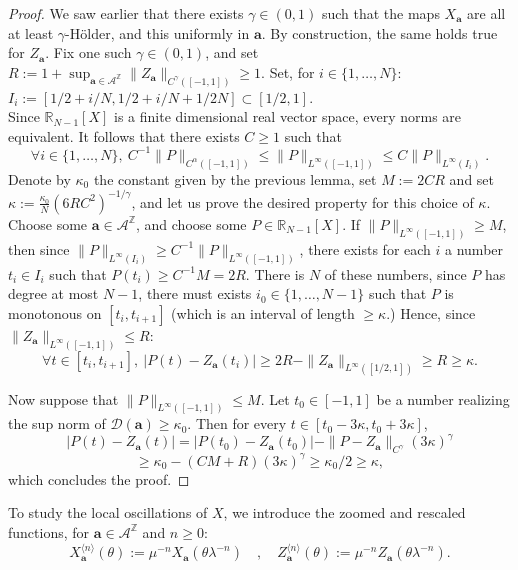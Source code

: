 \documentclass[11pt]{amsart}
\theoremstyle{plain}
\theoremstyle{definition}
\numberwithin{equation}{section}
\begin{document}
\begin{proof}
We saw earlier that there exists $\gamma \in (0,1)$ such that the maps $X_\mathbf{a}$ are all at least $\gamma$-Hölder, and this uniformly in $\mathbf{a}$. By construction, the same holds true for $Z_\mathbf{a}$. Fix one such $\gamma \in (0,1)$, and set $R := 1+ \sup_{\mathbf{a} \in \mathcal{A}^\mathbb{Z}} \|Z_\mathbf{a}\|_{C^\gamma([-1,1])} \geq 1$. Set, for $i \in \{1,\dots,N\}$: $I_i := [1/2+i/N,1/2+i/N+1/2N] \subset [1/2,1]$.   \\
Since $\mathbb{R}_{N-1}[X]$ is a finite dimensional real vector space, every norms are equivalent. It follows that there exists $C \geq 1$ such that $$ \forall i \in  \{ 1, \dots, N \}, \  C^{-1} \|P\|_{C^\alpha([-1,1])} \leq \|P\|_{L^\infty([-1,1])} \leq C \|P\|_{L^\infty(I_i)}.$$
Denote by $\kappa_0$ the constant given by the previous lemma, set $M := 2CR$ and set $\kappa := \frac{\kappa_0}{N} (6R C^2 )^{-1/\gamma}$, and let us prove the desired property for this choice of $\kappa$. Choose some $\mathbf{a} \in \mathcal{A}^\mathbb{Z}$, and choose some $P \in \mathbb{R}_{N-1}[X]$. If $\|P\|_{L^\infty([-1,1])} \geq M$, then since $\|P\|_{L^\infty(I_i)} \geq C^{-1} \|P\|_{L^\infty([-1,1])}$, there exists for each $i$ a number $t_i \in I_i$ such that $P(t_i) \geq C^{-1}M = 2R$. There is $N$ of these numbers, since $P$ has degree at most $N-1$, there must exists $i_0 \in \{1,\dots,N-1\}$ such that $P$ is monotonous on $[t_i,t_{i+1}]$ (which is an interval of length $\geq \kappa$.) Hence, since $\|Z_\mathbf{a}\|_{L^\infty([-1,1])} \leq R$:
$$\forall t \in [t_i,t_{i+1}], \ |P(t)-Z_\mathbf{a}(t_i)| \geq 2R-\|Z_\mathbf{a}\|_{L^\infty([1/2,1])} \geq R \geq \kappa. $$

Now suppose that $\|P\|_{L^\infty([-1,1])}\leq M$. Let $t_0 \in [-1,1]$ be a number realizing the sup norm of $\mathcal{D}(\mathbf{a}) \geq \kappa_0$. Then for every $t \in [t_0-3\kappa,t_0+3\kappa]$, 
$$ |P(t)-Z_\mathbf{a}(t)| = |P(t_0)-Z_\mathbf{a}(t_0)| - \|P-Z_\mathbf{a}\|_{C^{\gamma}} (3\kappa)^\gamma $$ $$\geq \kappa_0-(CM+R)(3\kappa)^\gamma \geq \kappa_0/2 \geq \kappa, $$
which concludes the proof.
\end{proof}


To study the local oscillations of $X$, we introduce the zoomed and rescaled functions, for $\mathbf{a} \in \mathcal{A}^\mathbb{Z}$ and $n \geq 0$:
$$ X_\mathbf{a}^{\langle n \rangle}(\theta) := \mu^{-n} X_{\mathbf{a}}(\theta \lambda^{-n}) \quad , \quad Z_\mathbf{a}^{\langle n \rangle}(\theta) := \mu^{-n} Z_{\mathbf{a}}(\theta \lambda^{-n}). $$
\end{document}
